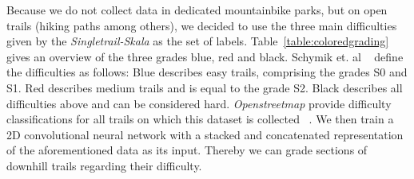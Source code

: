 \documentclass[runningheads]{llncs}
\begin{document}
Because we do not collect data in dedicated mountainbike parks, but on open trails (hiking paths among others), we decided to use the three main difficulties given by the \textit{Singletrail-Skala} as the set of labels.
Table~\ref{table:coloredgrading} gives an overview of the three grades blue, red and black.
Schymik et. al ~\cite{schymik2008singletrail} define the difficulties as follows:
Blue describes easy trails, comprising the grades S0 and S1.
Red describes medium trails and is equal to the grade S2.
Black describes all difficulties above and can be considered hard.
\textit{Openstreetmap} provide difficulty classifications for all trails on which this dataset is collected ~\cite{osmsingletrails}.
We then train a 2D convolutional neural network with a stacked and concatenated representation of the aforementioned data as its input.
Thereby we can grade sections of downhill trails regarding their difficulty.
\end{document}
